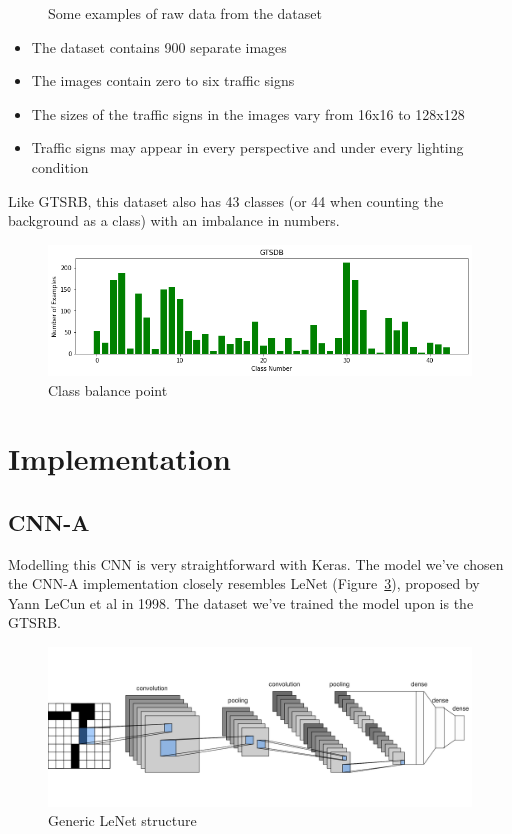 \documentclass[12pt, landscape]{article}
\begin{document}
\begin{multicols}{3}
\begin{figure}[H]
\begin{tabular}{cc}
    \end{tabular}
    \caption{Some examples of raw data from the dataset}
    \label{fig:dataset2examples}
\end{figure}
\begin{itemize}
    \item The dataset contains 900 separate images
    \item The images contain zero to six traffic signs
    \item The sizes of the traffic signs in the images vary from 16x16 to 128x128
    \item Traffic signs may appear in every perspective and under every lighting
    condition
\end{itemize}

Like GTSRB, this dataset also has 43 classes (or 44 when counting the background as a class) with an imbalance in numbers.
\begin{figure}[H]
    \centerline{\includegraphics[scale = 0.5]{gtsdb.png}}
    \caption{Class balance point}
    \label{fig:dataset2balance}
\end{figure}


\section{Implementation}

\subsection{CNN-A}
Modelling this CNN is very straightforward with Keras. The model we've chosen the
CNN-A implementation closely resembles LeNet (Figure~\ref{fig:lenetstructure}),
proposed by Yann LeCun et al in 1998. The dataset we've trained the model upon
is the GTSRB.
\begin{figure}[H]
    \centerline{\includegraphics[scale = 0.2]{lenet.png}}
    \caption{Generic LeNet structure}
    \label{fig:lenetstructure}
\end{figure}


\end{multicols}
\end{document}
